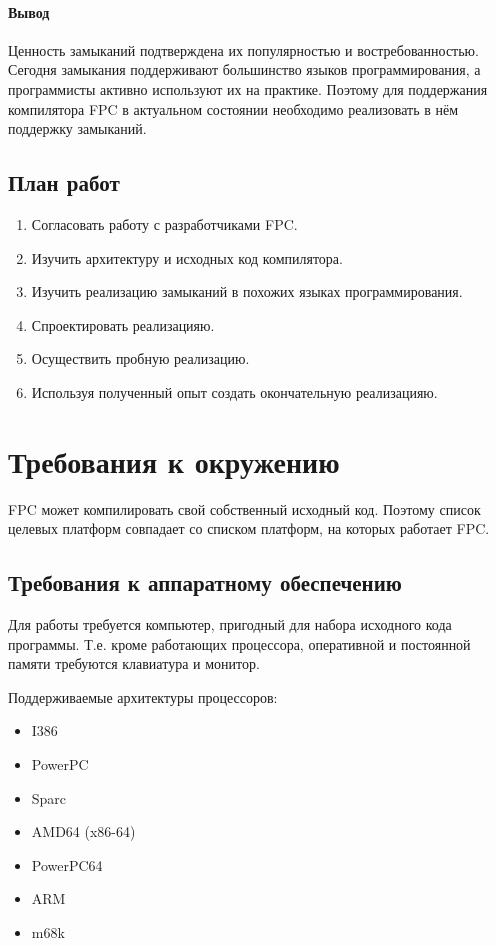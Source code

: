 \documentclass{imcs}
\begin{document}
\paragraph{Вывод}
Ценность замыканий подтверждена их популярностью и востребованностью. 
Сегодня замыкания поддерживают большинство языков программирования, а программисты 
активно используют их на практике. Поэтому для поддержания компилятора FPC в 
актуальном состоянии необходимо реализовать в нём поддержку замыканий.

\subsection{План работ}

\begin{enumerate}
    \item Согласовать работу с разработчиками FPC.
    \item Изучить архитектуру и исходных код компилятора.
    \item Изучить реализацию замыканий в похожих языках программирования.
    \item Спроектировать реализацияю.
    \item Осуществить пробную реализацию.
    \item Используя полученный опыт создать окончательную реализацияю.
\end{enumerate}

\section{Требования к окружению}

FPC может компилировать свой собственный исходный код. Поэтому
список целевых платформ совпадает со списком платформ, на которых работает
FPC.

\subsection{Требования к аппаратному обеспечению}

Для работы требуется компьютер, пригодный для набора исходного кода программы.
Т.е. кроме работающих процессора, оперативной и постоянной памяти требуются
клавиатура и монитор.

Поддерживаемые архитектуры процессоров\cite{fpctargets}:
\begin{itemize}
    \item I386
    \item PowerPC
    \item Sparc
    \item AMD64 (x86-64)
    \item PowerPC64
    \item ARM
    \item m68k 
\end{itemize}
\end{document}
